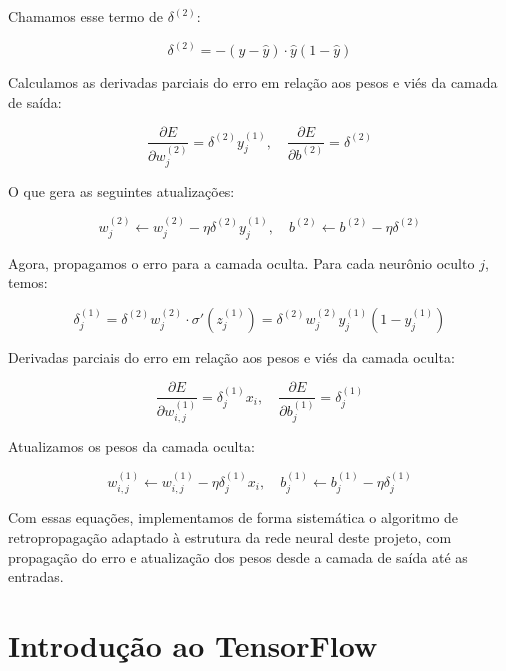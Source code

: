 \documentclass[12pt,a4paper,oneside]{report}
\begin{document}
	Chamamos esse termo de $\delta^{(2)}$:
	
	\begin{equation}
		\delta^{(2)} = -(y - \hat{y}) \cdot \hat{y}(1 - \hat{y})
	\end{equation}
	
	Calculamos as derivadas parciais do erro em relação aos pesos e viés da camada de saída:
	
	\begin{equation}
		\frac{\partial E}{\partial w_j^{(2)}} = \delta^{(2)} y_j^{(1)}, \quad \frac{\partial E}{\partial b^{(2)}} = \delta^{(2)}
	\end{equation}
	
	O que gera as seguintes atualizações:
	
	\begin{equation}
		w_j^{(2)} \leftarrow w_j^{(2)} - \eta \delta^{(2)} y_j^{(1)}, \quad b^{(2)} \leftarrow b^{(2)} - \eta \delta^{(2)}
	\end{equation}
	
	Agora, propagamos o erro para a camada oculta. Para cada neurônio oculto $j$, temos:
	
	\begin{equation}
		\delta_j^{(1)} = \delta^{(2)} w_j^{(2)} \cdot \sigma'(z_j^{(1)}) = \delta^{(2)} w_j^{(2)} y_j^{(1)} (1 - y_j^{(1)})
	\end{equation}
	
	Derivadas parciais do erro em relação aos pesos e viés da camada oculta:
	
	\begin{equation}
		\frac{\partial E}{\partial w_{i,j}^{(1)}} = \delta_j^{(1)} x_i, \quad \frac{\partial E}{\partial b_j^{(1)}} = \delta_j^{(1)}
	\end{equation}
	
	Atualizamos os pesos da camada oculta:
	
	\begin{equation}
		w_{i,j}^{(1)} \leftarrow w_{i,j}^{(1)} - \eta \delta_j^{(1)} x_i, \quad b_j^{(1)} \leftarrow b_j^{(1)} - \eta \delta_j^{(1)}
	\end{equation}
	
	Com essas equações, implementamos de forma sistemática o algoritmo de retropropagação adaptado à estrutura da rede neural deste projeto, com propagação do erro e atualização dos pesos desde a camada de saída até as entradas.

\chapter{Introdução ao TensorFlow}
\end{document}
